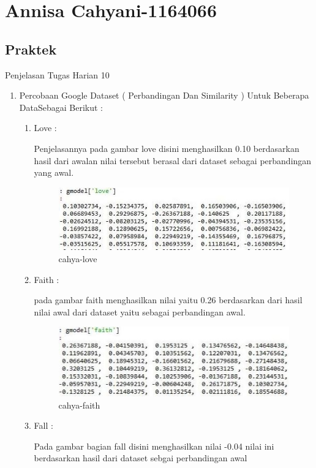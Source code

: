 \section{Annisa Cahyani-1164066}
\subsection{Praktek}
Penjelasan Tugas Harian 10  
\begin{enumerate}
\item Percobaan Google Dataset ( Perbandingan Dan Similarity ) Untuk Beberapa DataSebagai  Berikut :
\begin{enumerate}
\item Love :
\par Penjelasannya  pada gambar love disini menghasilkan 0.10  berdasarkan hasil dari awalan nilai tersebut berasal dari dataset sebagai perbandingan yang awal.
\par
\begin{figure}[!hbtp]
\centering
\includegraphics[scale=0.2]{figures/cahya-love.jpg}
\caption{cahya-love}
\label{cahya-love}
\end{figure}
\par
\item Faith : 
\par pada gambar faith menghasilkan nilai yaitu 0.26 berdasarkan dari hasil nilai awal dari dataset yaitu sebagai perbandingan awal.
\par
\begin{figure}[!hbtp]
\centering
\includegraphics[scale=0.2]{figures/cahya-faith.jpg}
\caption{ cahya-faith}
\label{ cahya-faith}
\end{figure}
\par
\item Fall :  
\par Pada gambar bagian fall disini menghasilkan nilai -0.04 nilai ini  berdasarkan hasil dari dataset  sebgai perbandingan awal

\end{enumerate}
\end{enumerate}
